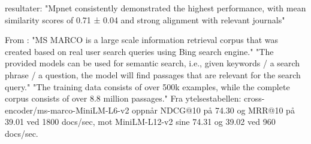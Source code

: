 resultater:
"Mpnet consistently demonstrated the highest performance, with mean similarity scores of 0.71 ± 0.04 and strong alignment with relevant journals"

From \parencite{sbert_ce_msmarco}:
"MS MARCO is a large scale information retrieval corpus that was created based on real user search queries using Bing search engine."
"The provided models can be used for semantic search, i.e., given keywords / a search phrase / a question, the model will find passages that are relevant for the search query."
"The training data consists of over 500k examples, while the complete corpus consists of over 8.8 million passages."
Fra ytelsestabellen: cross-encoder/ms-marco-MiniLM-L6-v2 oppnår NDCG@10 på 74.30 og MRR@10 på 39.01 ved 1800 docs/sec, mot MiniLM-L12-v2 sine 74.31 og 39.02 ved 960 docs/sec.

